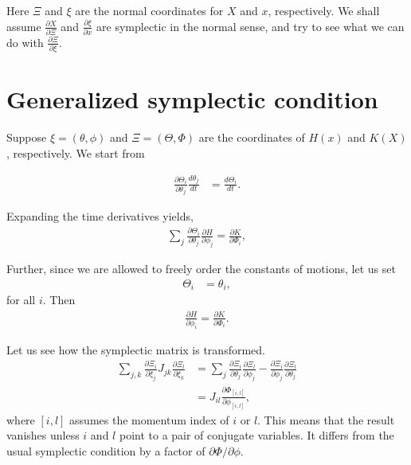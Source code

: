 \documentclass{article}
\begin{document}
Here $\Xi$ and $\xi$ are the normal coordinates for $X$ and $x$, respectively.
We shall assume $\frac{ \partial X }{ \partial \Xi }$
and  $\frac{ \partial \xi }{ \partial x }$ are symplectic in the normal sense,
and try to see what we can do with $\frac{ \partial \Xi }{ \partial \xi }$.


\section{Generalized symplectic condition}

Suppose $\xi = (\theta, \phi)$ and $\Xi = (\Theta, \Phi)$
are the coordinates of $H(x)$ and $K(X)$, respectively.
We start from

\begin{align}
\frac{\partial \Theta_i }{\partial \theta_j}
\frac{d \theta_j }{dt}
&=
\frac{d \Theta_i }{dt}.
\end{align}

Expanding the time derivatives yields,
\begin{align}
\sum_{j}
\frac{\partial \Theta_i }{\partial \theta_j}
\frac{\partial H}{\partial \phi_j}
=
\frac{\partial K}{\partial \Phi_i},
\tag{*}
\end{align}

Further, since we are allowed to freely order the constants of motions,
let us set
\begin{align}
\Theta_i &= \theta_i,
\end{align}
for all $i$.  Then
\begin{align}
\frac{\partial H}{\partial \phi_i}
=
\frac{\partial K}{\partial \Phi_i}.
\tag{$*'$}
\end{align}

Let us see how the symplectic matrix is transformed.
\begin{align}
\sum_{j,k}
\frac{\partial \Xi_i }{\partial \xi_j}
J_{jk}
\frac{\partial \Xi_l}{\partial \xi_k}
&=
\sum_{j}
\frac{\partial \Xi_i }{\partial \theta_j}
\frac{\partial \Xi_l}{\partial \phi_j}
-
\frac{\partial \Xi_i }{\partial \phi_j}
\frac{\partial \Xi_l}{\partial \theta_j}
\\
&= J_{il} \frac{\partial \Phi_{[i,l]} }{\partial \phi_{[i,l]} },
\tag{S}
\end{align}
where $[i,l]$ assumes the momentum index of $i$ or $l$.
This means that the result vanishes unless
$i$ and $l$ point to a pair of conjugate variables.
It differs from the usual symplectic condition by a factor
of $\partial \Phi/\partial \phi$.
\end{document}
